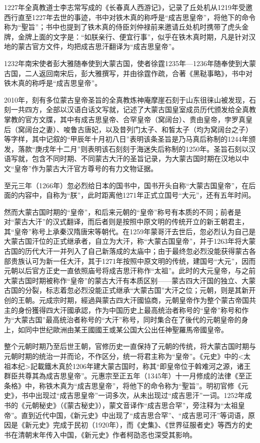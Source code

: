 1227年全真教道士李志常写成的《长春真人西游记》，记录了丘处机从1219年受邀西行直至1227年去世的事迹，书中对铁木真的称呼是“成吉思皇帝”，将他下的命令称为“聖旨”；书中也提到了铁木真的侍臣刘仲禄前来邀请丘处机时携带了虎头金牌，金牌上面的文字是：“如朕亲行、便宜行事”，似乎在铁木真时期，凡是针对汉地的蒙古官方文件，均把成吉思汗翻译为“成吉思皇帝”。

1232年南宋使者彭大雅随奉使到大蒙古国，使者徐霆1235年—1236年随奉使到大蒙古国，二人返回南宋后，彭大雅撰写，并由徐霆作疏，合著《黑鞑事略》，书中对铁木真的称呼是“成吉思皇帝”。

2010年，刻有多位蒙古皇帝圣旨的全真教炼神庵摩崖石刻于山东徂徕山被发现，石刻一共四方，全部以汉语白话文写就，记述了大蒙古国皇室成员历代颁发给全真教掌教的官方文牒，其中有成吉思皇帝、合罕皇帝（窝阔台）、贵由皇帝，孛罗真皇后（窝阔台之妻）、唆鲁古唐妃，以及昔列门太子、和皙太子（均为窝阔台之子）等字样，其中记叙的“甲辰年十月初八日”表明该条圣旨是乃马真后称制的1244年颁发，落款“庚戌年十二月”则表明该石刻刻于海迷失后称制的1250年。圣旨石刻以汉语写就，包含不同时期、不同蒙古大汗的圣旨记录，为大蒙古国时期在汉地以中文“皇帝”作为蒙古大汗官方尊号的有力文物证据。

至元三年（1266年）忽必烈给日本的国书中，国书开头自称“大蒙古国皇帝”，在后面的内容中，自称为“朕”，此时距离他1271年正式立国号“大元”，还有五年时间。

然而大蒙古国时期的“皇帝”，和后来元朝的“皇帝”称号有本质的不同；前者是对“蒙古大汗”的汉式翻译，而后者则是按照中原文明的传统开立的新王朝君主，其“皇帝”称号上承秦汉隋唐宋等朝代。在1259年蒙哥汗去世后，忽必烈认为自己是大蒙古国汗位的正式继承者，自立为大汗，称“大蒙古国皇帝”，并于1263年将大蒙古国的历代大汗一并列入了自己新落成的太庙中；由于最终忽必烈没能获得蒙古各部贵族认可为新一任大汗，其于1271年按照中原文明的传统，建国号“大元”，因而元朝以后官方正史一直依照庙号将成吉思汗称作“太祖”。此时的大元皇帝，与之前大蒙古国时期被称作“皇帝”的蒙古大汗有本质区别——蒙古四大汗国的独立、大蒙古国的分裂，标志着忽必烈没能正式继承“大蒙古国”大汗之位；元朝，则是其新开创的王朝。元成宗时期，經過與蒙古四大汗國協商，元朝皇帝作为整个蒙古帝国共主的身份獲得四大汗國承認，作为中国历史上最高统治者称号的“皇帝”称号和作为“大蒙古国”最高统治者称号的“大汗”称号，同时集合在了後代的元朝皇帝的身上，如同中世纪歐洲由某王國國王或某公国大公出任神聖羅馬帝國皇帝。

整个元朝时期乃至后世王朝，官修历史一直保持了元朝的传统，将大蒙古国时期与元朝时期的统治一并而论，不作区分，统一将君主称为“皇帝”。《元史》中的<太祖本纪>記載鐵木真於1206年建大蒙古国时，称其“即皇帝位于斡难河之源，诸王群臣共尊其為成吉思皇帝”。元惠宗至正五年（1345年）十一月修成的法律《至正条格》中，称铁木真为“成吉思皇帝”，将他下的命令称为“聖旨”。明初官修《元史》，书中出现过“成吉思皇帝”一词多次，从未出现过“成吉思汗”一词。1252年成书的《元朝秘史》（《蒙古秘史》），蒙文音译作“成吉思合罕”，旁注释为“太祖皇帝”。直到近代中国，《新元史》中出现了“成吉思合罕”、“成吉思可汗”等词语，原因是《新元史》完成于民初（1920年），而《史集》、《世界征服者史》等西方的史书在清朝末年传入中国，《新元史》作者柯劭忞也深受其影响。

